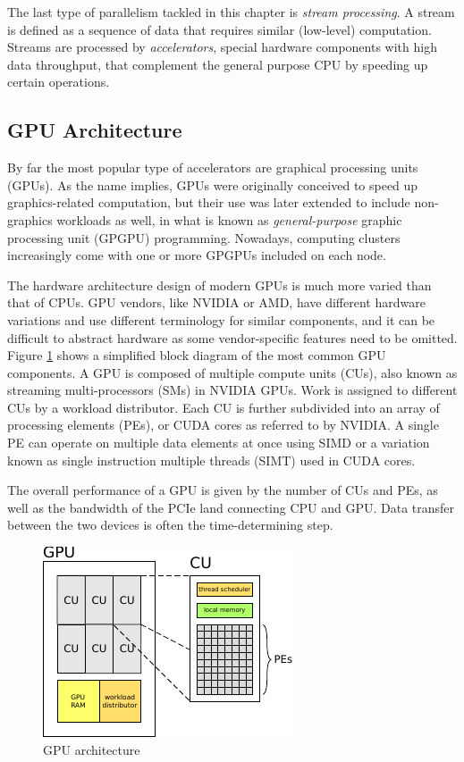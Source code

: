 The last type of parallelism tackled in this chapter is \emph{stream processing}. A stream is defined as a sequence of data that requires similar (low-level) computation. Streams are processed by \emph{accelerators}, special hardware components with high data throughput, that complement the general purpose CPU by speeding up certain operations. 

\subsection{GPU Architecture}

By far the most popular type of accelerators are graphical processing units (GPUs). As the name implies, GPUs were originally conceived to speed up graphics-related computation, but their use was later extended to include non-graphics workloads as well, in what is known as \emph{general-purpose} graphic processing unit (GPGPU) programming. Nowadays, computing clusters increasingly come with one or more GPGPUs included on each node.

The hardware architecture design of modern GPUs is much more varied than that of CPUs. GPU vendors, like NVIDIA or AMD, have different hardware variations and use different terminology for similar components, and it can be difficult to abstract hardware as some vendor-specific features need to be omitted. Figure \ref{fig:gpu} shows a simplified block diagram of the most common GPU components. A GPU is composed of multiple compute units (CUs), also known as streaming multi-processors (SMs) in NVIDIA GPUs. Work is assigned to different CUs by a workload distributor. Each CU is further subdivided into an array of processing elements (PEs), or CUDA cores as referred to by NVIDIA. A single PE can operate on multiple data elements at once using SIMD or a variation known as single instruction multiple threads (SIMT) used in CUDA cores.

The overall performance of a GPU is given by the number of CUs and PEs, as well as the bandwidth of the PCIe land connecting CPU and GPU. Data transfer between the two devices is often the time-determining step.

\begin{figure}
\centering
\includegraphics[scale=2.0]{Pics/gpu}
\caption{GPU architecture}
\label{fig:gpu}
\end{figure}

